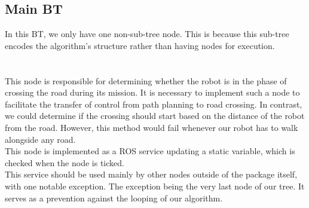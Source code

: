     \subsection{Main BT}
        In this BT, we only have one non-sub-tree node. This is because this sub-tree encodes the algorithm's structure rather than having nodes for execution.\\\\
        \\
            This node is responsible for determining whether the robot is in the phase of crossing the road during its mission. It is necessary to implement such a node to facilitate the transfer of control from path planning to road crossing. In contrast, we could determine if the crossing should start based on the distance of the robot from the road. However, this method would fail whenever our robot has to walk alongside any road.\\
            This node is implemented as a ROS service updating a static variable, which is checked when the node is ticked.\\
            This service should be used mainly by other nodes outside of the package itself, with one notable exception. The exception being the very last node of our tree. It serves as a prevention against the looping of our algorithm.
    
    
    
    